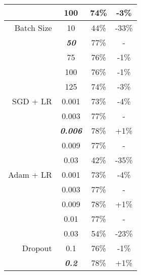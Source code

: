 \begin{table}[!hbt]
\begin{tabular}{|r|c|c|c|}
		& 100                     & 74\% & -3\%                  \\ \hline
		Batch Size                      & 10                      & 44\% & -33\%                 \\ \cline{2-4} 
		& \textit{\textbf{50}}    & 77\% & -                     \\ \cline{2-4} 
		& 75                      & 76\% & -1\%                  \\ \cline{2-4} 
		& 100                     & 76\% & -1\%                  \\ \cline{2-4} 
		& 125                     & 74\% & -3\%                  \\ \hline
		SGD + LR                        & 0.001                   & 73\% & -4\%                  \\ \cline{2-4} 
		& 0.003                   & 77\% & -                     \\ \cline{2-4} 
		& \textit{\textbf{0.006}} & 78\% & +1\%                  \\ \cline{2-4} 
		& 0.009                   & 77\% & -                     \\ \cline{2-4} 
		& 0.03                    & 42\% & -35\%                 \\ \hline
		Adam + LR                       & 0.001                   & 73\% & -4\%                  \\ \cline{2-4} 
		& 0.003                   & 77\% & -                     \\ \cline{2-4} 
		& 0.009                   & 78\% & +1\%                  \\ \cline{2-4} 
		& 0.01                    & 77\% & -                     \\ \cline{2-4} 
		& 0.03                    & 54\% & -23\%                 \\ \hline
		Dropout                         & 0.1                     & 76\% & -1\%                  \\ \cline{2-4} 
		& \textit{\textbf{0.2}}   & 78\% & +1\%                  \\ \hline
	\end{tabular}
\label{optparams}
\end{table}
\clearpage
